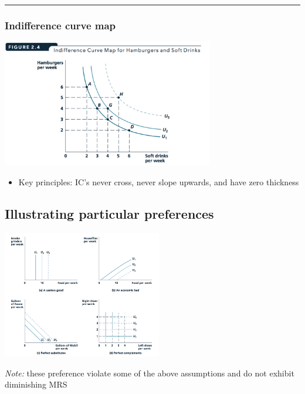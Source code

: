 \documentclass[]{article}
\providecommand{\tightlist}{%
  \setlength{\itemsep}{0pt}\setlength{\parskip}{0pt}}
\begin{document}
\begin{center}\rule{0.5\linewidth}{\linethickness}\end{center}

\hypertarget{indifference-curve-map}{%
\subsubsection{Indifference curve map}\label{indifference-curve-map}}

\includegraphics[height=2.2in]{picsfigs/indifcurvemap.png}

\begin{itemize}
\tightlist
\item
  Key principles: IC's never cross, never slope upwards, and have zero thickness
\end{itemize}

\hypertarget{illustrating-particular-preferences}{%
\subsection{Illustrating particular preferences}\label{illustrating-particular-preferences}}

\includegraphics[height=2.2in]{picsfigs/particularpreferences.png}

\emph{Note:} these preference violate some of the above assumptions and do not exhibit diminishing MRS

\bigskip
\end{document}

